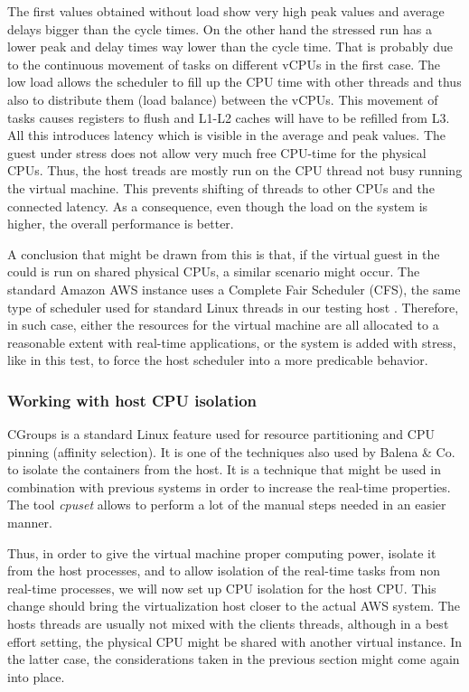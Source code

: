 \documentclass[]{scrartcl}
\begin{document}
\bigskip

The first values obtained without load show very high peak values and average delays bigger than the cycle times. On the other hand the stressed run has a lower peak and delay times way lower than the cycle time. That is probably due to the continuous movement of tasks on different vCPUs in the first case. 
The low load allows the scheduler to fill up the CPU time with other threads and thus also to distribute them (load balance) between the vCPUs.
This movement of tasks causes registers to flush and L1-L2 caches will have to be refilled from L3. 
All this introduces latency which is visible in the average and peak values.
The guest under stress does not allow very much free CPU-time for the physical CPUs. Thus, the host treads are mostly run on the CPU thread not busy running the virtual machine. This prevents shifting of threads to other CPUs and the connected latency. As a consequence, even though the load on the system is higher, the overall performance is better. 

A conclusion that might be drawn from this is that, if the virtual guest in the could is run on shared physical CPUs, a similar scenario might occur. The standard Amazon AWS instance uses a Complete Fair Scheduler (CFS), the same type of scheduler used for standard Linux threads in our testing host \cite{xen01}.
Therefore, in such case, either the resources for the virtual machine are all allocated to a reasonable extent with real-time applications, or the system is added with stress, like in this test, to force the host scheduler into a more predicable behavior. 

\subsubsection{Working with host CPU isolation}

CGroups is a standard Linux feature used for resource partitioning and CPU pinning (affinity selection). It is one of the techniques also used by Balena \& Co. to isolate the containers from the host. It is a technique that might be used in combination with previous systems in order to increase the real-time properties. The tool \textit{cpuset} allows to perform a lot of the manual steps needed in an easier manner. 

Thus, in order to give the virtual machine proper computing power, isolate it from the host processes, and to allow isolation of the real-time tasks from non real-time processes, we will now set up CPU isolation for the host CPU.
This change should bring the virtualization host closer to the actual AWS system. The hosts threads are usually not mixed with the clients threads, although in a best effort setting, the physical CPU might be shared with another virtual instance. In the latter case, the considerations taken in the previous section might come again into place.
\end{document}
